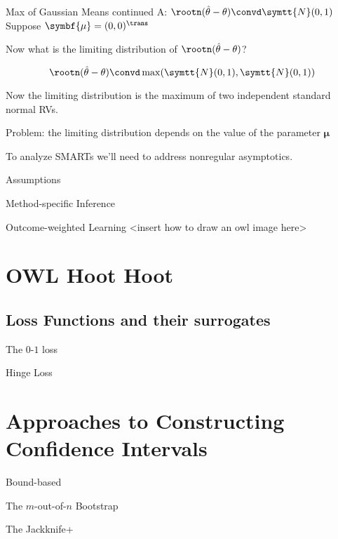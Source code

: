 \documentclass[aspectratio=169, professionalfonts]{beamer}
\begin{document}
\begin{frame}{Max of Gaussian Means continued}
	A: $\rootn (\hat{\theta} - \theta) \convd \symtt{N}(0, 1)$
	\pause
	\vfill
	Suppose $\symbf{\mu} = (0 , 0)^{\trans}$

	Now what is the limiting distribution of $ \rootn (\hat{\theta} - \theta)$?

	\vfill \pause

	$$\rootn (\hat{\theta} - \theta) \convd \max(\symtt{N}(0, 1), \symtt{N}(0, 1))$$

	Now the limiting distribution is the maximum of two independent standard
	normal RVs.

	\vfill \pause

	Problem: the limiting distribution depends on the value of the parameter
	$\symbf{\mu}$

	\vfill

	To analyze SMARTs we'll need to address nonregular asymptotics.
\end{frame}


\begin{frame}{Assumptions}
\end{frame}

\begin{frame}{Method-specific Inference}
\end{frame}

\begin{frame}{Outcome-weighted Learning}
	<insert how to draw an owl image here>
\end{frame}


\section{OWL Hoot Hoot}

\begin{frame}{}
\end{frame}

\begin{frame}{}
\end{frame}


\subsection{Loss Functions and their surrogates}
\begin{frame}{The $0$-$1$ loss}
\end{frame}

\begin{frame}{Hinge Loss}
\end{frame}

\section{Approaches to Constructing Confidence Intervals}

\begin{frame}{Bound-based}
\end{frame}

\begin{frame}{The $m$-out-of-$n$ Bootstrap}
\end{frame}

\begin{frame}{The Jackknife+}
\end{frame}
\end{document}
